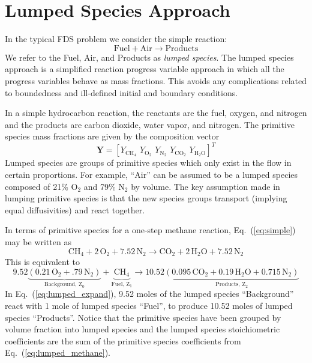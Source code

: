 \section{Lumped Species Approach}
In the typical FDS problem we consider the simple reaction:
\begin{equation}\label{eq:simple}
\mathrm{Fuel + Air \rightarrow Products}
\end{equation}
We refer to the Fuel, Air, and Products as \emph{lumped species}.  The lumped species approach is a simplified reaction progress variable approach \cite{fox2003} in which all the progress variables behave as mass fractions. This avoids any complications related to boundedness and ill-defined initial and boundary conditions.

In a simple hydrocarbon reaction, the reactants are the fuel, oxygen, and nitrogen and the products are carbon dioxide, water vapor, and nitrogen. The primitive species mass fractions are given by the composition vector
\begin{equation}\label{eq:prim_vector}
\mathbf{Y} = [Y_{\mathrm{CH}_4}\, \, Y_{\mathrm{O}_2}\, \, Y_{\mathrm{N}_2}\, \, Y_{\mathrm{CO}_2}\, \, Y_{\mathrm{H}_2\mathrm{O}}]^T
\end{equation}
Lumped species are groups of primitive species which only exist in the flow in certain proportions. For example, ``Air'' can be assumed to be a lumped species composed of 21\% O$_2$ and 79\% N$_2$ by volume. The key assumption made in lumping primitive species is that the new species groups transport (implying equal diffusivities) and react together.

In terms of primitive species for a one-step methane reaction, Eq.~(\ref{eq:simple}) may be written as
\begin{equation}\label{eq:lumped_methane}
\mbox{CH}_4 + 2\, \mbox{O}_2+7.52\,\mbox{N}_2 \rightarrow \mbox{CO}_2+2\,\mbox{H}_2\mbox{O}+7.52\,\mbox{N}_2
\end{equation}
This is equivalent to
\begin{equation}\label{eq:lumped_expand}
\mathrm{9.52\underbrace{(0.21\,\mbox{O}_2+.79\,\mbox{N}_2)}_\text{Background,~$Z_0$}+\underbrace{\mbox{CH}_4}_\text{Fuel,~$Z_1$} \rightarrow 10.52\underbrace{(0.095\,\mbox{CO}_2+0.19\,\mbox{H}_2\mbox{O}+0.715\,\mbox{N}_2)}_\text{Products,~$Z_2$}}
\end{equation}
In Eq.~(\ref{eq:lumped_expand}), 9.52 moles of the lumped species ``Background'' react with 1 mole of lumped species ``Fuel'', to produce 10.52 moles of lumped species ``Products''.  Notice that the primitive species have been grouped by volume fraction into lumped species and the lumped species stoichiometric coefficients are the sum of the primitive species coefficients from Eq.~(\ref{eq:lumped_methane}).

